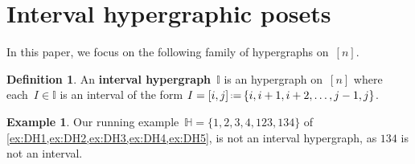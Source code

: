 \documentclass{amsart}
\theoremstyle{definition}
\newtheorem{definition}[theorem]{Definition}
\newtheorem{example}[theorem]{Example}
\newcommand{\eqdef}{\mbox{\,\raisebox{0.2ex}{\scriptsize\ensuremath{\mathrm:}}\ensuremath{=}\,}} %
\newcommand{\defn}[1]{\textbf{\textsf{\color{PineGreen} #1}}} %
\newcommand{\HH}{\mathbb H}  %
\newcommand{\II}{\mathbb I} %
\begin{document}

\section{Interval hypergraphic posets}
\label{sec:IHP}

In this paper, we focus on the following family of hypergraphs on~$[n]$.

\begin{definition}
An \defn{interval hypergraph}~$\II$ is an hypergraph on~$[n]$ where each~$I \in \II$ is an interval of the form $I = [i,j] \eqdef \{i, i+1, i+2, \dots, j-1, j\}$.
\end{definition}

\begin{example}
Our running example~$\HH=\{ 1, 2, 3, 4, 123, 134 \}$  of \cref{ex:DH1,ex:DH2,ex:DH3,ex:DH4,ex:DH5}, is not an interval hypergraph, as $134$ is not an interval.
\end{example}
\end{document}
